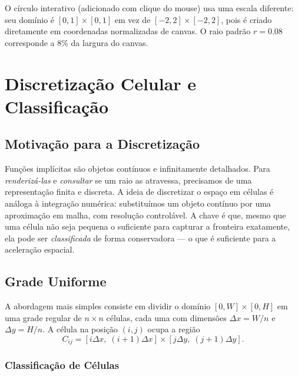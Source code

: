 \documentclass[11pt,a4paper]{article}
\theoremstyle{plain}
\theoremstyle{definition}
\begin{document}
\begin{tcolorbox}[atencao]
O círculo interativo (adicionado com clique do mouse) usa uma escala diferente:
seu domínio é $[0,1] \times [0,1]$ em vez de $[-2,2] \times [-2,2]$, pois é
criado diretamente em coordenadas normalizadas de canvas. O raio padrão $r = 0.08$
corresponde a $8\%$ da largura do canvas.
\end{tcolorbox}

\section{Discretização Celular e Classificação}
\label{sec:discretizacao}

\subsection{Motivação para a Discretização}

\begin{tcolorbox}[motivacao]
Funções implícitas são objetos contínuos e infinitamente detalhados. Para
\emph{renderizá-las} e \emph{consultar} se um raio as atravessa, precisamos de
uma representação finita e discreta. A ideia de discretizar o espaço em células
é análoga à integração numérica: substituímos um objeto contínuo por uma
aproximação em malha, com resolução controlável. A chave é que, mesmo que uma
célula não seja pequena o suficiente para capturar a fronteira exatamente, ela
pode ser \emph{classificada} de forma conservadora --- o que é suficiente para
a aceleração espacial.
\end{tcolorbox}

\subsection{Grade Uniforme}

A abordagem mais simples consiste em dividir o domínio $[0, W] \times [0, H]$
em uma grade regular de $n \times n$ células, cada uma com dimensões
$\Delta x = W/n$ e $\Delta y = H/n$. A célula na posição $(i, j)$ ocupa a
região
\[
    C_{ij} = [i \Delta x,\; (i+1)\Delta x] \times [j \Delta y,\; (j+1)\Delta y].
\]

\subsubsection{Classificação de Células}
\end{document}
